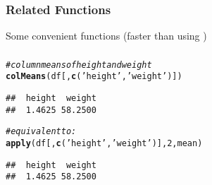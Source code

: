\documentclass[12pt]{beamer}\usepackage[]{graphicx}\usepackage[]{color}
\makeatletter
\newcommand{\hlnum}[1]{\textcolor[rgb]{0.686,0.059,0.569}{#1}}%
\newcommand{\hlstr}[1]{\textcolor[rgb]{0.192,0.494,0.8}{#1}}%
\newcommand{\hlcom}[1]{\textcolor[rgb]{0.678,0.584,0.686}{\textit{#1}}}%
\newcommand{\hlstd}[1]{\textcolor[rgb]{0.345,0.345,0.345}{#1}}%
\newcommand{\hlkwd}[1]{\textcolor[rgb]{0.737,0.353,0.396}{\textbf{#1}}}%
\newenvironment{kframe}{%
 \def\at@end@of@kframe{}%
 \ifinner\ifhmode%
  \def\at@end@of@kframe{\end{minipage}}%
  \begin{minipage}{\columnwidth}%
 \fi\fi%
 \def\FrameCommand##1{\hskip\@totalleftmargin \hskip-\fboxsep
 \colorbox{shadecolor}{##1}\hskip-\fboxsep
     \hskip-\linewidth \hskip-\@totalleftmargin \hskip\columnwidth}%
 \MakeFramed {\advance\hsize-\width
   \@totalleftmargin\z@ \linewidth\hsize
   \@setminipage}}%
 {\par\unskip\endMakeFramed%
 \at@end@of@kframe}
\newenvironment{knitrout}{}{} %
\makeatother
\begin{document}

\begin{frame}
\begin{center}
\Huge{}
\end{center}
\end{frame}


\begin{frame}
\frametitle{Related Functions}

Some convenient functions (faster than using )
\bi
  \item {}
  \item {}
  \item {}
  \item {}
\ei

\end{frame}


\begin{frame}[fragile]
\frametitle{}

\begin{knitrout}\footnotesize
{}\color{fgcolor}\begin{kframe}
\begin{alltt}
\hlcom{# column means of height and weight}
\hlkwd{colMeans}\hlstd{(df[ ,}\hlkwd{c}\hlstd{(}\hlstr{'height'}\hlstd{,} \hlstr{'weight'}\hlstd{)])}
\end{alltt}
\begin{verbatim}
##  height  weight 
##  1.4625 58.2500
\end{verbatim}
\begin{alltt}
\hlcom{# equivalent to:}
\hlkwd{apply}\hlstd{(df[ ,}\hlkwd{c}\hlstd{(}\hlstr{'height'}\hlstd{,} \hlstr{'weight'}\hlstd{)],} \hlnum{2}\hlstd{, mean)}
\end{alltt}
\begin{verbatim}
##  height  weight 
##  1.4625 58.2500
\end{verbatim}
\end{kframe}
\end{knitrout}

\end{frame}

\end{document}

